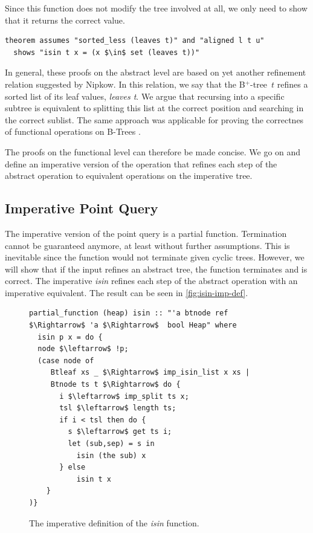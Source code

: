 \documentclass[a4paper,UKenglish,cleveref, autoref, thm-restate]{lipics-v2021}
\newcommand{\btree}{B$^+$-tree}
\begin{document}
Since this function does not modify the tree involved at all,
we only need to show that it returns the correct value.

\begin{lstlisting}[mathescape=true, language=Isabelle,label=lst:isin-set-inorder]
theorem assumes "sorted_less (leaves t)" and "aligned l t u" 
  shows "isin t x = (x $\in$ set (leaves t))"
\end{lstlisting}

In general, these proofs on the abstract level are 
based on yet another refinement relation suggested by Nipkow. \cite{DBLP:conf/itp/Nipkow16}
In this relation, we say that the \btree\ $t$ refines a sorted list of its leaf values, \emph{leaves t}.
We argue that recursing into a specific subtree
is equivalent to splitting this list at the correct position
and searching in the correct sublist.
The same approach was applicable for proving the correctnes of functional
operations on B-Trees \cite{DBLP:journals/afp/Mundler21}.

The proofs on the functional level can therefore be made concise.
We go on and define an imperative version of the operation that
refines each step of the abstract operation to equivalent operations on the imperative tree.

\subsection{Imperative Point Query}
\label{sec:imperative_pq}

The imperative version of the point query is a partial function.
Termination cannot be guaranteed anymore,
at least without further assumptions.
This is inevitable since the function would not terminate
given cyclic trees.
However, we will show that if the input refines an abstract tree,
the function terminates and is correct.
The imperative \emph{isin} refines each step of the abstract
operation with an imperative equivalent.
The result can be seen in \autoref{fig:isin-imp-def}.

\begin{figure}
    \centering
\begin{lstlisting}[mathescape=true, language=Isabelle,label=lst:isin-imp-def]
partial_function (heap) isin :: "'a btnode ref $\Rightarrow$ 'a $\Rightarrow$  bool Heap" where
  isin p x = do {
  node $\leftarrow$ !p;
  (case node of
     Btleaf xs _ $\Rightarrow$ imp_isin_list x xs |
     Btnode ts t $\Rightarrow$ do {
       i $\leftarrow$ imp_split ts x;
       tsl $\leftarrow$ length ts;
       if i < tsl then do {
         s $\leftarrow$ get ts i;
         let (sub,sep) = s in
           isin (the sub) x
       } else
           isin t x
    }
)}
\end{lstlisting}
\caption[Definition of imperative \emph{isin}]{
    The imperative definition of the \emph{isin} function.
}
\label{fig:isin-imp-def}
\end{figure}
\end{document}

